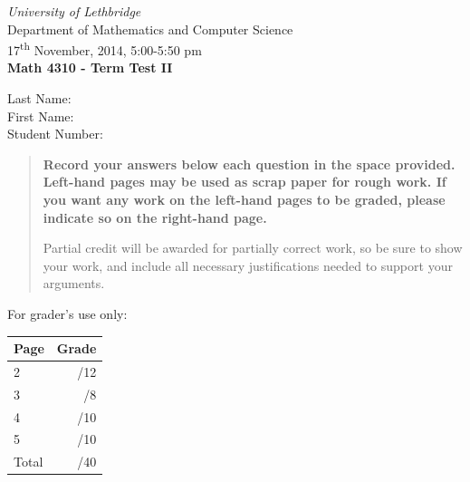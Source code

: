 \documentclass[12pt]{article}
\newcommand{\skipline}{\vspace{12pt}}
\begin{document}
\author{Instructor: Sean Fitzpatrick}
\thispagestyle{plain}
\begin{center}
\emph{University of Lethbridge}\\
Department of Mathematics and Computer Science\\
17\textsuperscript{th} November, 2014, 5:00-5:50 pm\\
{\bf Math 4310 - Term Test II}\\
\end{center}
Last Name:\underline{\hspace{50pt}{\bf SOLUTIONS}\hspace{50pt}}\\
\skipline
First Name:\underline{\hspace{50pt}{\bf THE}\hspace{100pt}}\\
\skipline
Student Number:\underline{\hspace{322pt}}\\


\vspace{0.5in}


\begin{quote}
 {\bf Record your answers below each question in the space provided.    Left-hand pages may be used as scrap paper for rough work.  If you want any work on the left-hand pages to be graded, please indicate so on the right-hand page.
 
 \bigskip
 
Partial credit will be awarded for partially correct work, so be sure to show your work, and include all necessary justifications needed to support your arguments. 
}
\end{quote}


\vspace{0.5in}

For grader's use only:

\begin{table}[hbt]
\begin{center}
\begin{tabular}{|l|r|} \hline
Page&Grade\\
\hline \hline
\cline{1-2} 2 & \enspace\enspace\enspace\enspace\enspace\enspace/12\\
\cline{1-2} 3 & \enspace\enspace\enspace\enspace\enspace\enspace/8\\
\cline{1-2} 4 & \enspace\enspace\enspace\enspace\enspace\enspace/10\\
\cline{1-2} 5 & \enspace\enspace\enspace\enspace\enspace\enspace/10\\
\cline{1-2} Total & \enspace\enspace\enspace\enspace\enspace\enspace/40\\
\hline
\end{tabular}

\skipline

\skipline

\skipline


\end{center}
\end{table}
\newpage
\end{document}
